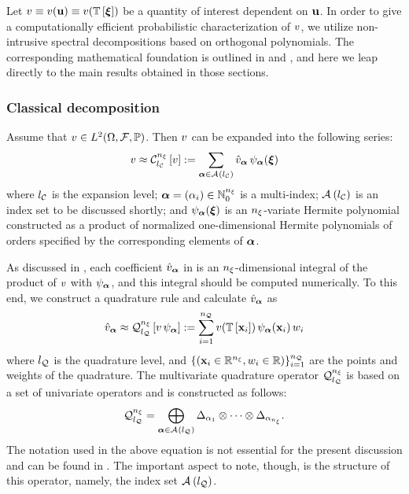 Let $\w \equiv \w(\vu) \equiv \w(\transformation{\vz})$ be a quantity of interest dependent on $\mathbf{u}$.
In order to give a computationally efficient probabilistic characterization of $v$, we utilize non-intrusive spectral decompositions based on orthogonal polynomials.
The corresponding mathematical foundation is outlined in  and , and here we leap directly to the main results obtained in those sections.

\subsubsection{Classical decomposition}
Assume that $v \in L^{2}(\Omega, \mathcal{F}, \mathbb{P})$.
Then $v$ can be expanded into the following series:
\begin{equation} \elab{spectral-decomposition}
  \w \approx \chaos{\nvars}{\nclevel}{\w} := \sum_{\multiindex \in \chaosMultiindexSet{\nclevel}} \coefficient{\w}_{\multiindex} \, \polynomial_{\multiindex}(\vz)
\end{equation}
where ${l_\mathcal{C}}$ is the expansion level; $\bm{\alpha} = (\alpha_i) \in \mathbb{N}_{0}^{n_\xi}$ is a multi-index; $\mathcal{A}_{}\left( {l_\mathcal{C}} \right)$ is an index set to be discussed shortly; and $\psi_{\bm{\alpha}}(\bm{\xi})$ is an ${n_\xi}$-variate Hermite polynomial constructed as a product of normalized one-dimensional Hermite polynomials of orders specified by the corresponding elements of $\bm{\alpha}$.

As discussed in , each coefficient $\hat{v}_{\bm{\alpha}}$ in  is an ${n_\xi}$-dimensional integral of the product of $v$ with $\psi_{\bm{\alpha}}$, and this integral should be computed numerically.
To this end, we construct a quadrature rule and calculate $\hat{v}_{\bm{\alpha}}$ as
\begin{equation} \elab{numerical-integration}
  \coefficient{\w}_{\multiindex} \approx \quadrature{\nvars}{\nqlevel}{\w \, \polynomial_{\multiindex}} := \sum_{i = 1}^\nqorder \w(\transformation{\point_i}) \, \polynomial_{\multiindex}(\point_i) \, \weight_i
\end{equation}
where ${l_\mathcal{Q}}$ is the quadrature level, and $\{ (\mathbf{x}_i \in \mathbb{R}^{n_\xi}, w_i \in \mathbb{R}) \}_{i = 1}^{n_\mathcal{Q}}$ are the points and weights of the quadrature.
The multivariate quadrature operator $\quadrature$ is based on a set of univariate operators and is constructed as follows:
\begin{equation} \elab{smolyak-sparse-grid}
  \quadrature = \bigoplus_{\multiindex \in \quadratureMultiindexSet{\nqlevel}} \Delta_{\alpha_1} \otimes \cdots \otimes \Delta_{\alpha_\nvars}.
\end{equation}
The notation used in the above equation is not essential for the present discussion and can be found in .
The important aspect to note, though, is the structure of this operator, namely, the index set $\mathcal{A}_{}\left( {l_\mathcal{Q}} \right)$.

